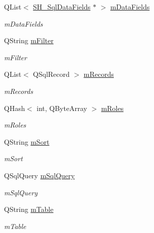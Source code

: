 \begin{DoxyCompactItemize}
\item 
Q\-List$<$ \hyperlink{classSimpleHotel_1_1SH__SqlDataFields}{S\-H\-\_\-\-Sql\-Data\-Fields} $\ast$ $>$ \hyperlink{classSimpleHotel_1_1SH__SqlDataModel_aa583366a8960adea9a0719a63fa03a24}{m\-Data\-Fields}
\begin{DoxyCompactList}\small\item\em m\-Data\-Fields \end{DoxyCompactList}\item 
Q\-String \hyperlink{classSimpleHotel_1_1SH__SqlDataModel_a597b97e579df9747a3844fa3e72dcf08}{m\-Filter}
\begin{DoxyCompactList}\small\item\em m\-Filter \end{DoxyCompactList}\item 
Q\-List$<$ Q\-Sql\-Record $>$ \hyperlink{classSimpleHotel_1_1SH__SqlDataModel_af73abbb951de936944285571f34407c5}{m\-Records}
\begin{DoxyCompactList}\small\item\em m\-Records \end{DoxyCompactList}\item 
Q\-Hash$<$ int, Q\-Byte\-Array $>$ \hyperlink{classSimpleHotel_1_1SH__SqlDataModel_a2a8b95a8c1dc58f69ef1b67ef5247093}{m\-Roles}
\begin{DoxyCompactList}\small\item\em m\-Roles \end{DoxyCompactList}\item 
Q\-String \hyperlink{classSimpleHotel_1_1SH__SqlDataModel_ad515dcc1a6f0ab5ae7cb1b354b596c42}{m\-Sort}
\begin{DoxyCompactList}\small\item\em m\-Sort \end{DoxyCompactList}\item 
Q\-Sql\-Query \hyperlink{classSimpleHotel_1_1SH__SqlDataModel_a6dec49c799f534f4b19902e6eb1c99a7}{m\-Sql\-Query}
\begin{DoxyCompactList}\small\item\em m\-Sql\-Query \end{DoxyCompactList}\item 
Q\-String \hyperlink{classSimpleHotel_1_1SH__SqlDataModel_a567dcf9f5f9088ef90238d86272b3121}{m\-Table}
\begin{DoxyCompactList}\small\item\em m\-Table \end{DoxyCompactList}\end{DoxyCompactItemize}


